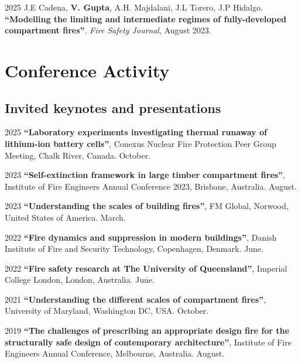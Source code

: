 \documentclass[12pt,letterpaper]{report}
\begin{document}
\begin{tablist}
	\item[2025] \tab J.E Cadena, \textbf{V. Gupta}, A.H. Majdalani, J.L Torero, J.P Hidalgo. \textbf{\enquote{Modelling the limiting and intermediate regimes of fully-developed compartment fires}}. \textit{Fire Safety Journal}, August 2023.
        
				
	\end{tablist}

    
	
 
    \section*{Conference Activity}

    \subsection*{Invited keynotes and presentations}
	
	\begin{tablist}

    \item[2025] \tab \textbf{\enquote{Laboratory experiments investigating thermal runaway of lithium-ion battery cells}}, Conexus Nuclear Fire Protection Peer Group Meeting, Chalk River, Canada. October. 

    \item[2023] \tab \textbf{\enquote{Self-extinction framework in large timber compartment fires}}, Institute of Fire Engineers Annual Conference 2023, Brisbane, Australia. August. 

    \item[2023] \tab \textbf{\enquote{Understanding the scales of building fires}}, FM Global, Norwood, United States of America. March. 
 
	\item[2022] \tab \textbf{\enquote{Fire dynamics and suppression in modern buildings}}, Danish Institute of Fire and Security Technology, Copenhagen, Denmark. June. 
	
	\item[2022] \tab \textbf{\enquote{Fire safety research at The University of Queensland}}, Imperial College London, London, Australia. June. 
 
	\item[2021] \tab \textbf{\enquote{Understanding the different scales of compartment fires}}, University of Maryland, Washington DC, USA. October. 

    \item[2019] \tab \textbf{\enquote{The challenges of prescribing an appropriate design fire for the structurally safe design of contemporary architecture}}, Institute of Fire Engineers Annual Conference, Melbourne, Australia. August.
	
	\end{tablist}
\end{document}
